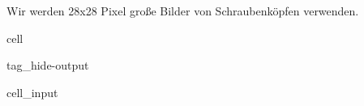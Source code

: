 \documentclass[letterpaper,10pt,english]{jupyterBook}
\begin{document}
\sphinxAtStartPar
Wir werden 28x28 Pixel große Bilder von Schraubenköpfen verwenden.

\begin{sphinxuseclass}{cell}
\begin{sphinxuseclass}{tag_hide-output}\begin{sphinxVerbatimInput}

\begin{sphinxuseclass}{cell_input}
\begin{sphinxVerbatim}[commandchars=\\\{\}]
   
   
\end{sphinxVerbatim}

\end{sphinxuseclass}\end{sphinxVerbatimInput}

\end{sphinxuseclass}
\end{sphinxuseclass}
\end{document}
